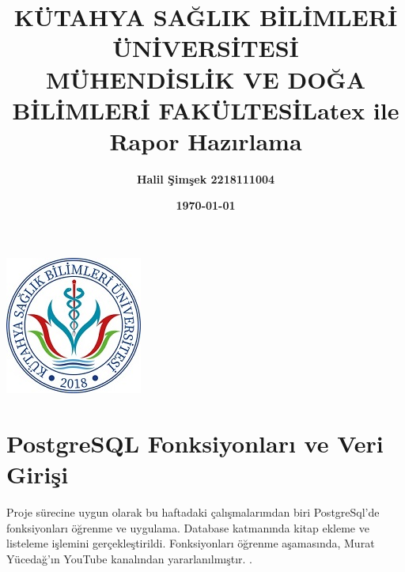 \documentclass[12pt, a4paper]{article}
\title{\bf\fontsize{12pt}{14pt}\selectfont KÜTAHYA SAĞLIK BİLİMLERİ ÜNİVERSİTESİ \\ MÜHENDİSLİK VE DOĞA BİLİMLERİ FAKÜLTESİ}
\date{}
\begin{document}
	\maketitle
	
	\begin{center}
		\includegraphics[width=0.25\linewidth]{ksbu.jpg}
	\end{center}	
	\begin{center}
		\vspace{1cm} 
	\end{center}
	\begin{center}
		\title{\bf\fontsize{12pt}{14pt}\selectfont Latex ile Rapor Hazırlama }
	\end{center}
	\begin{center}
		\vspace{1cm} %
	\end{center}
	\begin{center}
		
		\author{\bf\fontsize{12pt}{14pt}Halil Şimşek \hspace{1,5cm}2218111004}
		
		\begin{center}
			\vspace{1cm} 
		\end{center}
		\date{\textbf{\today}}
	\end{center}
	\newpage
	
	\section{PostgreSQL Fonksiyonları ve Veri Girişi}
	Proje sürecine uygun olarak bu haftadaki çalışmalarımdan biri PostgreSql'de fonksiyonları öğrenme ve uygulama.
	Database katmanında kitap ekleme ve listeleme işlemini gerçekleştirildi.
	Fonksiyonları öğrenme aşamasında, Murat Yücedağ'ın YouTube kanalından yararlanılmıştır. \cite{kanal:isim}.  \newline
	
\end{document}
